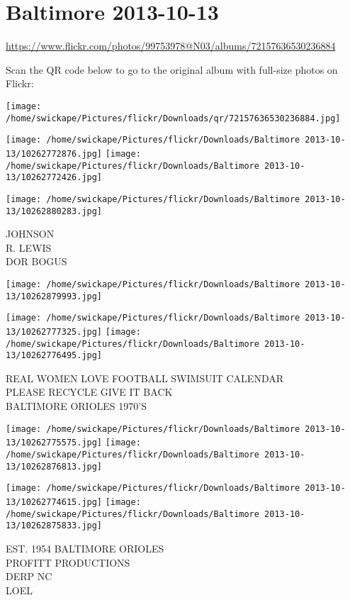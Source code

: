 \documentclass[10pt,letterpaper]{article}
\title{}
\author{}
\date{}
\begin{document}
\section*{Baltimore 2013-10-13}

\url{https://www.flickr.com/photos/99753978@N03/albums/72157636530236884}

Scan the QR code below to go to the original album with full-size photos on Flickr:

\texttt{[image: /home/swickape/Pictures/flickr/Downloads/qr/72157636530236884.jpg]}
\pagebreak

\texttt{[image: /home/swickape/Pictures/flickr/Downloads/Baltimore 2013-10-13/10262772876.jpg]}
\texttt{[image: /home/swickape/Pictures/flickr/Downloads/Baltimore 2013-10-13/10262772426.jpg]}

\vspace{0.25in}
\texttt{[image: /home/swickape/Pictures/flickr/Downloads/Baltimore 2013-10-13/10262880283.jpg]}

JOHNSON\\
R. LEWIS\\
DOR BOGUS
\pagebreak

\texttt{[image: /home/swickape/Pictures/flickr/Downloads/Baltimore 2013-10-13/10262879993.jpg]}

\vspace{0.25in}
\texttt{[image: /home/swickape/Pictures/flickr/Downloads/Baltimore 2013-10-13/10262777325.jpg]}
\texttt{[image: /home/swickape/Pictures/flickr/Downloads/Baltimore 2013-10-13/10262776495.jpg]}

REAL WOMEN LOVE FOOTBALL SWIMSUIT CALENDAR\\
PLEASE RECYCLE GIVE IT BACK\\
BALTIMORE ORIOLES 1970'S
\pagebreak

\texttt{[image: /home/swickape/Pictures/flickr/Downloads/Baltimore 2013-10-13/10262775575.jpg]}
\texttt{[image: /home/swickape/Pictures/flickr/Downloads/Baltimore 2013-10-13/10262876813.jpg]}

\texttt{[image: /home/swickape/Pictures/flickr/Downloads/Baltimore 2013-10-13/10262774615.jpg]}
\texttt{[image: /home/swickape/Pictures/flickr/Downloads/Baltimore 2013-10-13/10262875833.jpg]}

EST. 1954 BALTIMORE ORIOLES\\
PROFITT PRODUCTIONS\\
DERP NC\\
LOEL
\pagebreak
\end{document}
